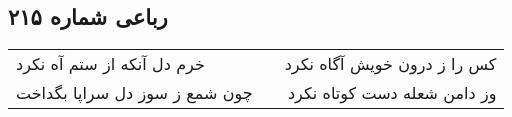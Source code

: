 \begin{center}
\section*{رباعی شماره ۲۱۵}
\label{sec:sh215}
\begin{longtable}{l p{0.5cm} r}
خرم دل آنکه از ستم آه نکرد
&&
کس را ز درون خویش آگاه نکرد
\\
چون شمع ز سوز دل سراپا بگداخت
&&
وز دامن شعله دست کوتاه نکرد
\\
\end{longtable}
\end{center}
